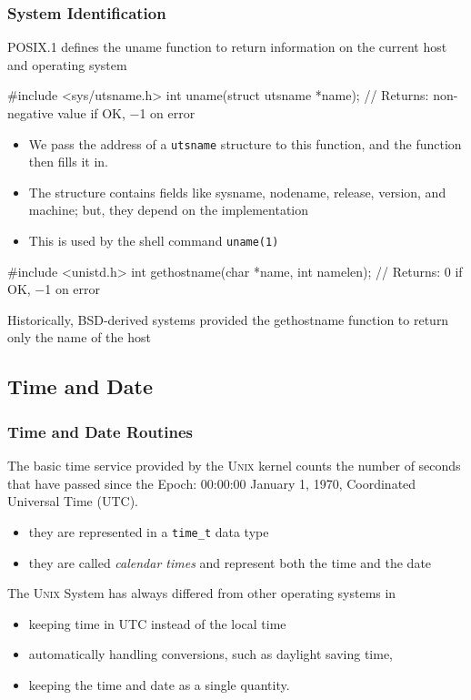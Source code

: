 \documentclass[newPxFont,sthlmFooter,nooffset]{beamer}
\begin{document}
\begin{frame}[containsverbatim,t]
  \frametitle{System Identification}
POSIX.1 defines the uname function to return information on the current host and operating system

\begin{codedef}
#include <sys/utsname.h>
int uname(struct utsname *name);
// Returns: non-negative value if OK, −1 on error
\end{codedef}

{\footnotesize
  \begin{itemize}
  \item We pass the address of a \texttt{utsname} structure to this function, and the function then fills it in.
  \item The structure contains fields like sysname, nodename, release, version, and machine; but, they depend on the implementation
  \item This is used by the shell command \texttt{uname(1)}
  \end{itemize}
}


\begin{codedef}
#include <unistd.h>
int gethostname(char *name, int namelen);
// Returns: 0 if OK, −1 on error
\end{codedef}
Historically, BSD-derived systems provided the gethostname function to return only the name of the host


\end{frame}


\subsection{Time and Date}

\begin{frame}[t]
  \frametitle{Time and Date Routines}
The basic time service provided by the \textsc{Unix} kernel counts the number of seconds that have passed since the Epoch: 00:00:00 January 1, 1970, Coordinated Universal Time (UTC).
\begin{itemize}
\item they are represented in a \texttt{time\_t} data type
\item they are called \textit{calendar times} and represent both the time and the date
\end{itemize}



The \textsc{Unix} System has always differed from other operating systems in
\begin{itemize}
\item keeping time in UTC instead of the local time
\item automatically handling conversions, such as daylight saving time,
\item keeping the time and date as a single quantity.
\end{itemize}


\end{frame}
\end{document}
